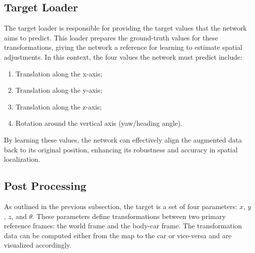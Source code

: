 \subsection{Target Loader}
The target loader is responsible for providing the target values that the network aims to predict. This loader prepares the ground-truth values for these transformations, giving the network a reference for learning to estimate spatial adjustments. In this context, the four values the network must predict include:
\begin{enumerate}
    \item Translation along the x-axis;
    \item Translation along the y-axis;
    \item Translation along the z-axis;
    \item Rotation around the vertical axis (yaw/heading angle).

\end{enumerate}
By learning these values, the network can effectively align the augmented data back to its original position, enhancing its robustness and accuracy in spatial localization.

\subsection{Post Processing}

As outlined in the previous subsection, the target is a set of four parameters: \( x \), \( y \), \( z \), and \( \theta \). These parameters define transformations between two primary reference frames: the world frame and the body-car frame. The transformation data can be computed either from the map to the car or vice-versa and are visualized accordingly.


